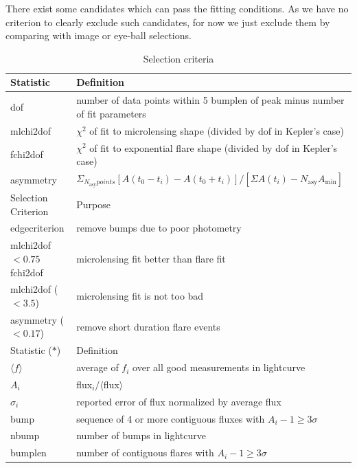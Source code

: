 \documentclass[iop, apj]{emulateapj}
\newcommand{\?}{\stackrel{?}{=}}
\begin{document}

There exist some candidates which can pass the fitting conditions. 
As we have no criterion to clearly exclude such candidates, 
for now we just exclude them by comparing with image or eye-ball selections. 



\begin{table}[t]%
\label{tab:selecond}
    \caption{Selection criteria}
    \begin{center}
   \begin{tabular}{ll}
      \hline %
   \multicolumn{1}{l}{Statistic}&\multicolumn{1}{l}{Definition}\\
 \hline 
dof & number of data points within 5 bumplen of peak minus number of fit parameters\\
mlchi2dof & $\chi^2$ of fit to microlensing shape (divided by dof in Kepler's case)\\
fchi2dof & $\chi^2$ of fit to exponential flare shape (divided by dof in Kepler's case)\\ 
asymmetry & $\Sigma_{N_\mathrm{asy} points} [A(t_0-t_i)-A(t_0+t_i)]/[\Sigma A(t_i)-N_\mathrm{asy}A_\mathrm{min}]$\\
  \hline
  \hline
   \multicolumn{1}{l}{Selection Criterion}&\multicolumn{1}{l}{Purpose}\\
 \hline 
edgecriterion & remove bumps due to poor photometry\\
mlchi2dof$<0.75$ fchi2dof & microlensing fit better than flare fit\\
mlchi2dof ($<3.5$) & microlensing fit is not too bad\\
asymmetry ($<0.17$) & remove short duration flare events\\
 \hline 
 \hline 
   \multicolumn{1}{l}{Statistic ($*$)}&\multicolumn{1}{l}{Definition}\\
 \hline 
$\langle f\rangle$ & average of $f_i$ over all good measurements in lightcurve\\
$A_i$ & flux$_i / \langle$flux$\rangle$\\
$\sigma_i$ & reported error of flux normalized by average flux\\
bump & sequence of 4 or more contiguous fluxes with $A_i-1 \geq 3\sigma$\\
nbump & number of bumps in lightcurve\\
bumplen & number of contiguous flares with $A_i-1 \geq 3\sigma$\\

\end{tabular}
\end{center}
\end{table}
\end{document}
